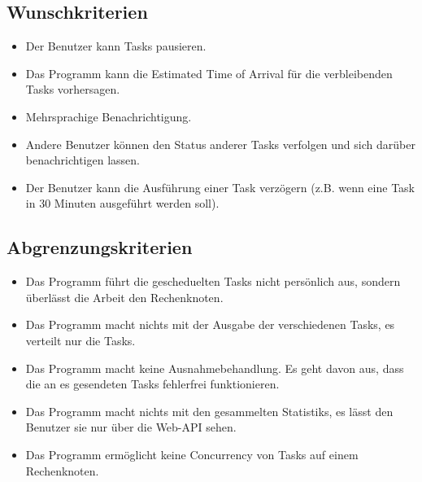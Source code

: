 \documentclass[a4paper,12pt]{article}
\begin{document}
\subsection{Wunschkriterien}
\begin{itemize}[nosep]

	\item Der Benutzer kann \glspl{Task} pausieren.	
	
	\item Das Programm kann die \gls{Estimated Time of Arrival} für die verbleibenden Tasks vorhersagen.
	
	\item Mehrsprachige Benachrichtigung.
	
	\item Andere Benutzer können den Status anderer Tasks verfolgen und sich darüber benachrichtigen lassen.
	
	\item Der Benutzer kann die Ausführung einer Task verzögern (z.B. wenn eine Task in 30 Minuten ausgeführt werden soll).
	
\end{itemize}

\subsection{Abgrenzungskriterien}
\begin{itemize}[nosep]

	\item Das Programm führt die gescheduelten \glspl{Task} nicht persönlich aus, sondern überlässt die Arbeit den \gls{Rechenknoten}.
	
	\item Das Programm macht nichts mit der Ausgabe der verschiedenen Tasks, es verteilt nur die Tasks.
	
	\item Das Programm macht keine \gls{Ausnahmebehandlung}. Es geht davon aus, dass die an es gesendeten Tasks fehlerfrei funktionieren.
	
	\item Das Programm macht nichts mit den gesammelten \glspl{Statistik}, es lässt den Benutzer sie nur über die \gls{Web-API} sehen.
	
	\item Das Programm ermöglicht keine \gls{Concurrency} von Tasks auf einem Rechenknoten.
	
\end{itemize}
\end{document}
